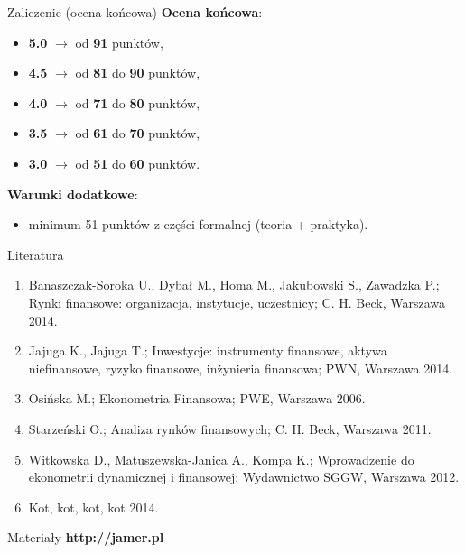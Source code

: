 \documentclass[a4paper, 11pt]{beamer}
\begin{document}
	\begin{frame}{Zaliczenie (ocena końcowa)}
		\textbf{Ocena końcowa}:
		\begin{itemize}
			\item \textbf{5.0} $\rightarrow$ od \textbf{91} punktów,
			\item \textbf{4.5} $\rightarrow$ od \textbf{81} do \textbf{90} punktów,
			\item \textbf{4.0} $\rightarrow$ od \textbf{71} do \textbf{80} punktów,
			\item \textbf{3.5} $\rightarrow$ od \textbf{61} do \textbf{70} punktów,
			\item \textbf{3.0} $\rightarrow$ od \textbf{51} do \textbf{60} punktów.
		\end{itemize}
		\textbf{Warunki dodatkowe}:
		\begin{itemize}
			\item minimum 51 punktów z części formalnej (teoria + praktyka).
		\end{itemize}
	\end{frame}
	
	\begin{frame}{Literatura}
		\begin{enumerate}
			\item Banaszczak-Soroka U., Dybał M., Homa M., Jakubowski S., Zawadzka P.; Rynki finansowe: organizacja, instytucje, uczestnicy; C. H. Beck, Warszawa 2014.
			\item Jajuga K., Jajuga T.; Inwestycje: instrumenty finansowe, aktywa niefinansowe, ryzyko finansowe, inżynieria finansowa; PWN, Warszawa 2014.
			\item Osińska M.; Ekonometria Finansowa; PWE, Warszawa 2006.
			\item Starzeński O.; Analiza rynków finansowych; C. H. Beck, Warszawa 2011.
			\item Witkowska D., Matuszewska-Janica A., Kompa K.; Wprowadzenie do ekonometrii dynamicznej i finansowej; Wydawnictwo SGGW, Warszawa 2012.
			\item Kot, kot, kot, kot 2014.
		\end{enumerate}
	\end{frame}
	
	\begin{frame}{Materiały}
		\Huge\bfseries
		\centering
		http://jamer.pl
	\end{frame}
\end{document}
